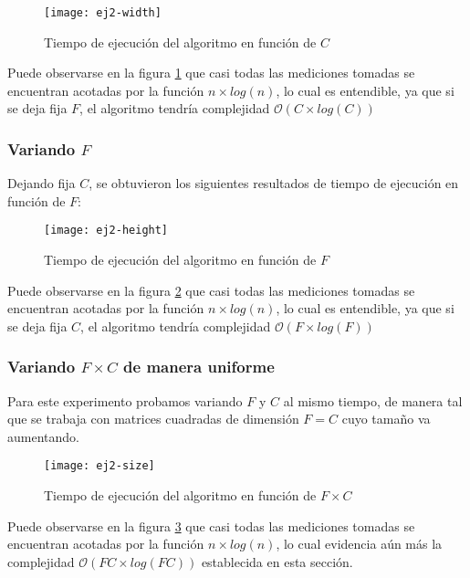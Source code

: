 \begin{figure}[H]
	\centering
	\texttt{[image: ej2-width]}
	\caption{Tiempo de ejecución del algoritmo en función de $C$}
	\label{fig:ej2-width-fig}
\end{figure}

Puede observarse en la figura \ref{fig:ej2-width-fig} que casi todas las mediciones tomadas se encuentran acotadas por la función $n \times log(n)$, lo cual es entendible, ya que si se deja fija $F$, el algoritmo tendría complejidad $\mathcal{O}(C \times log(C))$

\subsubsection{Variando $F$}

Dejando fija $C$, se obtuvieron los siguientes resultados de tiempo de ejecución en función de $F$:

\begin{figure}[H]
	\centering
	\texttt{[image: ej2-height]}
	\caption{Tiempo de ejecución del algoritmo en función de $F$}
	\label{fig:ej2-height-fig}
\end{figure}

Puede observarse en la figura \ref{fig:ej2-height-fig} que casi todas las mediciones tomadas se encuentran acotadas por la función $n \times log(n)$, lo cual es entendible, ya que si se deja fija $C$, el algoritmo tendría complejidad $\mathcal{O}(F \times log(F))$

\subsubsection{Variando $F \times C$ de manera uniforme}

Para este experimento probamos variando $F$ y $C$ al mismo tiempo, de manera tal que se trabaja con matrices cuadradas de dimensión $F = C$ cuyo tamaño va aumentando.

\begin{figure}[H]
	\centering
	\texttt{[image: ej2-size]}
	\caption{Tiempo de ejecución del algoritmo en función de $F \times C$}
	\label{fig:ej2-size-fig}
\end{figure}

Puede observarse en la figura \ref{fig:ej2-size-fig} que casi todas las mediciones tomadas se encuentran acotadas por la función $n \times log(n)$, lo cual evidencia aún más la complejidad $\mathcal{O}(FC \times log(FC))$ establecida en esta sección.
